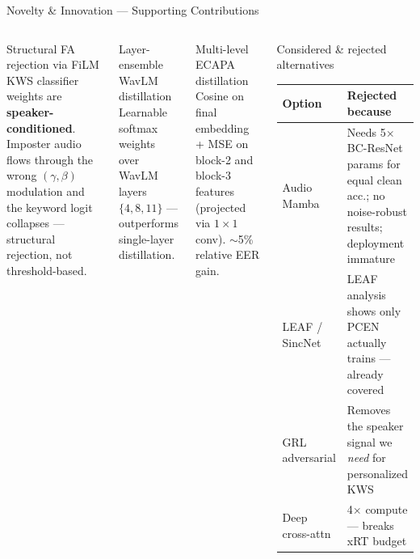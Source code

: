 \documentclass[aspectratio=169,10pt]{beamer}
\newcommand{\novel}[1]{\textcolor{srigold}{\textbf{#1}}}
\begin{document}
\begin{frame}{Novelty \& Innovation — Supporting Contributions}
  \small
  \begin{columns}[T, onlytextwidth]
      \begin{block}{\color{srired}Structural FA rejection via FiLM}
        KWS classifier weights are \novel{speaker-conditioned}. Imposter audio flows through the wrong $(\gamma,\beta)$ modulation and the keyword logit collapses — structural rejection, not threshold-based.\footnotemark[3]
      \end{block}
      \begin{block}{\color{srired}Layer-ensemble WavLM distillation}
        Learnable softmax weights over WavLM layers $\{4, 8, 11\}$ — outperforms single-layer distillation.\footnotemark[4]
      \end{block}
      \begin{block}{\color{srired}Multi-level ECAPA distillation}
        Cosine on final embedding + MSE on block-2 and block-3 features (projected via $1{\times}1$ conv). $\sim$5\% relative EER gain.\footnotemark[5]
      \end{block}
      \begin{block}{Considered \& rejected alternatives}
        \renewcommand{\arraystretch}{1.1}
        \begin{tabular}{@{}p{2.3cm}p{5.0cm}@{}}
          \toprule
          \textbf{Option} & \textbf{Rejected because} \\
          \midrule
          Audio Mamba & Needs 5$\times$ BC-ResNet params for equal clean acc.; no noise-robust results; deployment immature \\
          LEAF / SincNet & LEAF analysis shows only PCEN actually trains — already covered \\
          GRL adversarial & Removes the speaker signal we \emph{need} for personalized KWS \\
          Deep cross-attn & 4$\times$ compute — breaks xRT budget \\
          \bottomrule
        \end{tabular}
      \end{block}
  \end{columns}
\end{frame}
\end{document}
